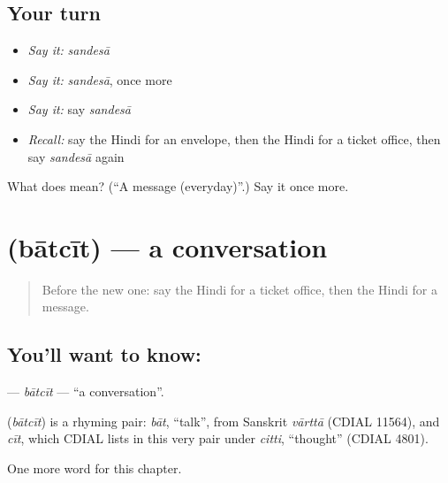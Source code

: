\subsection*{Your turn}
\begin{itemize}
\raggedright
  \item \emph{Say it:} \emph{sandesā}
  \item \emph{Say it:} \emph{sandesā}, once more
  \item \emph{Say it:} say \emph{sandesā}
  \item \emph{Recall:} say the Hindi for an envelope, then the Hindi for a ticket office, then say \emph{sandesā} again
\end{itemize}

\begin{tcolorbox}[breakable,colback=teal!4,colframe=teal!35!black,title={Before you move on}]
What does  mean? (\textquotedblleft{}A message (everyday)\textquotedblright{}.) Say it once more.
\end{tcolorbox}
\section[\texorpdfstring{\hi{बातचीत} (bātcīt)}{बातचीत (bātcīt)}]{ (bātcīt) — a conversation}

\label{lesson:HI-C205-batcit}



\begin{quote}
Before the new one: say the Hindi for a ticket office, then the Hindi for a message.
\end{quote}

\subsection*{You'll want to know: }
\textbf{} — \emph{bātcīt} — \textquotedblleft{}a conversation\textquotedblright{}.

\begin{cousinweb}
\textbf{} (\emph{bātcīt}) is a rhyming pair: \emph{bāt}, \textquotedblleft{}talk\textquotedblright{}, from Sanskrit \emph{vārttā} (CDIAL 11564), and \emph{cīt}, which CDIAL lists in this very pair under \emph{citti}, \textquotedblleft{}thought\textquotedblright{} (CDIAL 4801).
\end{cousinweb}

\begin{grammarlens}[title={What you've built}]
One more word for this chapter.
\end{grammarlens}

